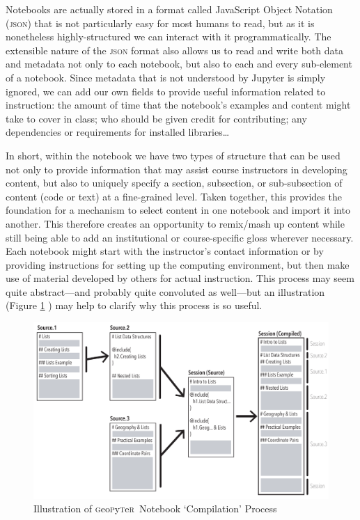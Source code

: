\documentclass[letter, 11pt,titlepage]{article}
\newcommand{\gp}{\textsc{g}eo\textsc{p}y\textsc{t}e\textsc{r}~\/}
\begin{document}
Notebooks are actually stored in a format called JavaScript Object Notation
(\textsc{json}) that is not particularly easy for most humans to read, but as it
is nonetheless highly-structured we can interact with it programmatically. The
extensible nature of the \textsc{json} format also allows us to read and write
both data and metadata not only to each notebook, but also to each and every
sub-element of a notebook. Since metadata that is not understood by Jupyter is
simply ignored, we can add our own fields to provide useful information related
to instruction: the amount of time that the notebook's examples and content
might take to cover in class; who should be given credit for contributing; any
dependencies or requirements for installed libraries\ldots

In short, within the notebook we have two types of structure that can be used
not only to provide information that may assist course instructors in developing
content, but also to uniquely specify a section, subsection, or sub-subsection
of content (code or text) at a fine-grained level. Taken together, this provides
the foundation for a mechanism to select content in one notebook and import it
into another. This therefore creates an opportunity to remix/mash up content
while still being able to add an institutional or course-specific gloss wherever
necessary. Each notebook might start with the instructor's contact information
or by providing instructions for setting up the computing environment, but then
make use of material developed by others for actual instruction. This process
may seem quite abstract---and probably quite convoluted as well---but an
illustration (Figure \ref{fig:Illustration} )
may help to clarify why this process is so useful.

\begin{figure}[hbtp]
  \centering
  \includegraphics[width=\textwidth, angle=0]{Illustration.pdf}
  \caption{Illustration of \gp Notebook `Compilation' Process}
  \label{fig:Illustration}
\end{figure}
\end{document}
